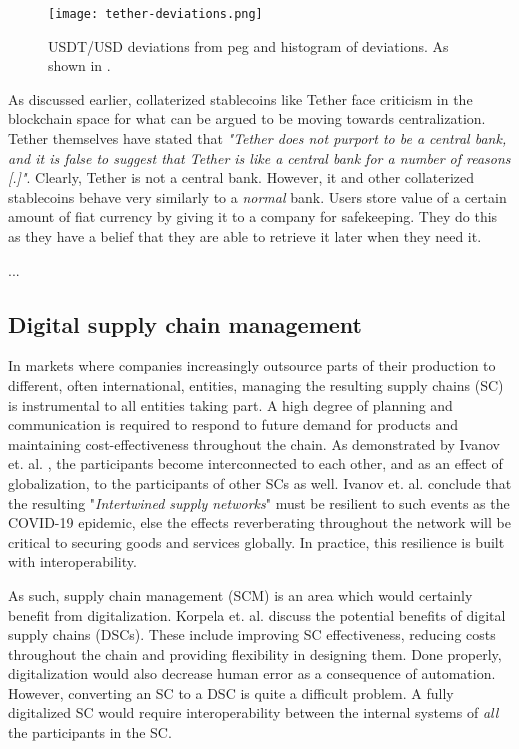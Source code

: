 \begin{figure}
  \texttt{[image: tether-deviations.png]}
  \caption{USDT/USD deviations from peg and histogram of deviations.
  As shown in \cite{lyonsStable}.}
  \label{fig:tether-deviations}
\end{figure}

As discussed earlier, collaterized stablecoins like Tether face
criticism in the blockchain space for what can be argued to be moving
towards centralization. Tether themselves have stated that \textit{"Tether does not purport to be a central bank, and it is false to suggest that Tether is like a
central bank for a number of reasons [.]"}. Clearly, Tether is not a
central bank. However, it and other collaterized stablecoins behave
very similarly to a \textit{normal} bank. Users store value of a certain
amount of fiat currency by giving it to a company for safekeeping. They
do this as they have a belief that they are able to retrieve it later when
they need it.


...

\subsection{Digital supply chain management}

In markets where companies increasingly outsource parts of their
production to different, often international, entities, managing the
resulting supply chains (SC) is instrumental to all entities taking
part. A high degree of planning and communication is required to
respond to future demand for products and maintaining
cost-effectiveness throughout the chain. As demonstrated by Ivanov et.
al. \cite{ivanovIntertwined}, the participants become interconnected
to each other, and as an effect of globalization, to the participants
of other SCs as well. Ivanov et. al. conclude that the resulting
"\textit{Intertwined supply networks}" must be resilient to such
events as the COVID-19 epidemic, else the effects reverberating
throughout the network will be critical to securing goods and
services globally. In practice, this resilience is built with interoperability.

As such, supply chain management (SCM) is an area which would
certainly benefit from digitalization. Korpela et. al.
\cite{korpelaDSC} discuss the potential benefits of digital supply
chains (DSCs). These include improving SC effectiveness, reducing
costs throughout the chain and providing flexibility in designing
them. Done properly, digitalization would also decrease human error as
a consequence of automation.  However, converting an SC to a DSC is
quite a difficult problem. A fully digitalized SC would require
interoperability between the internal systems of \textit{all} the
participants in the SC.

